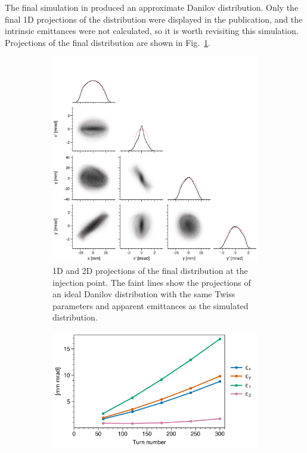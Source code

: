 The final simulation in \cite{Holmes2018} produced an approximate Danilov distribution. Only the final 1D projections of the distribution were displayed in the publication, and the intrinsic emittances were not calculated, so it is worth revisiting this simulation. Projections of the final distribution are shown in Fig.~\ref{fig:Holmes_corner_compare}.
%
\begin{figure}[!p]
    \centering
    \begin{subfigure}{0.8\textwidth}
        \includegraphics[width=\textwidth]{Images/chapter3/Holmes_corner_compare.png}
        \caption{1D and 2D projections of the final distribution at the injection point. The faint lines show the projections of an ideal Danilov distribution with the same Twiss parameters and apparent emittances as the simulated distribution.}
        \label{fig:Holmes_corner_compare}
    \end{subfigure}
    \vfill
    \vspace*{1.25cm}
    \vfill
    \begin{subfigure}{0.5\textwidth}
        \includegraphics[width=\textwidth]{Images/chapter3/Holmes_emittances.png}

\end{subfigure}
\end{figure}
